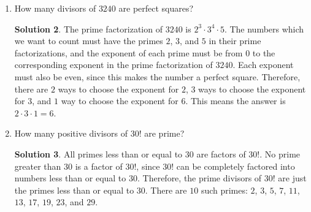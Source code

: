 \documentclass{article}
\theoremstyle{definition}
\newtheorem*{solution}{Solution}
\begin{document}
\begin{multicols}{2}
\begin{enumerate}
\begin{solution}
                W must be one of the letters of this state, since it's the $23$rd letter of the
                alphabet and no multiple of $23$ is a letter.
                Clearly, the other letters can't be C, C, C, and E.
                So, we have to multiply some factors and see what letters we get.
                If we use $3 \cdot 3 = 9$ and $3 \cdot 5 = 15$, we get the letters I and O.
                Now we have three letters: W, I, and O.
                Since $A = 1$, we have $9 \cdot 15 \cdot 23 \cdot 1 = 3105$.
                These letters can be arranged to spell the name of the state in the US
                that has a product value of $3105$, which is .
            \end{solution}
        \item How many divisors of $3240$ are perfect squares?
            \begin{solution}
                The prime factorization of $3240$ is $2^3 \cdot 3^4 \cdot 5$.
                The numbers which we want to count must have the primes $2$, $3$, and $5$ in their
                prime factorizations, and the exponent of each prime must be from $0$ to the
                corresponding exponent in the prime factorization of $3240$.
                Each exponent must also be even, since this makes the number a perfect square.
                Therefore, there are $2$ ways to choose the exponent for $2$, $3$ ways to choose
                the exponent for $3$, and $1$ way to choose the exponent for $6$.
                This means the answer is $2 \cdot 3 \cdot 1 = \boxed{6}$.
            \end{solution}
        \item How many positive divisors of $30!$ are prime?
            \begin{solution}
                All primes less than or equal to $30$ are factors of $30!$.
                No prime greater than $30$ is a factor of $30!$,
                since $30!$ can be completely factored into numbers less than or equal to $30$.
                Therefore, the prime divisors of $30!$ are just the primes less than
                or equal to $30$.
                There are $\boxed{10}$ such primes:
                $2$, $3$, $5$, $7$, $11$, $13$, $17$, $19$, $23$, and $29$.
            \end{solution}
    \end{enumerate}
\end{multicols}
\end{document}

